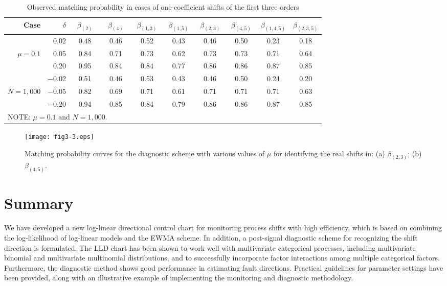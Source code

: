 \begin{table}[ht]
\tabcolsep 6.0pt \vspace{-0.3cm} \centering \caption{Observed matching probability
in cases of one-coefficient shifts of the first three orders} \vspace{0.3cm}
\renewcommand{\arraystretch}{1.25}
\begin{tabular}{r|r|c|c|c|c|c|c|c|c}\hline
Case & $\delta$ & $\;\;\beta_{(2)}\;\;$ & $\;\;\beta_{(4)}\;\;$ &
$\;\beta_{(1,3)}\;$ & $\;\beta_{(1,5)}\;$ & $\;\beta_{(2,3)\;}$ &
$\;\beta_{(4,5)}\;$ & $\beta_{(1,4,5)}$ & $\beta_{(2,3,5)}$
\\\hline
& 0.02 & 0.48 & 0.46 & 0.52 & 0.43 & 0.46 & 0.50 & 0.23 & 0.18 \\
$\mu=0.1$ & 0.05 & 0.84 & 0.71 & 0.73 & 0.62 & 0.73 & 0.73 & 0.71 & 0.64 \\
& 0.20 & 0.95 & 0.84 & 0.84 & 0.77 & 0.86 & 0.86 & 0.87 & 0.85 \\
& $-$0.02 & 0.51 & 0.46 & 0.53 & 0.43 & 0.46 & 0.50 & 0.24 & 0.20 \\
$N=1,000$ & $-$0.05 & 0.82 & 0.69 & 0.71 & 0.61 & 0.71 & 0.71 & 0.71 & 0.63 \\
& $-$0.20 & 0.94 & 0.85 & 0.84 & 0.79 & 0.86 & 0.86 & 0.87 & 0.85
\\\hline
\multicolumn{10}{l}{NOTE: $\mu=0.1$ and $N=1,000$.}
\end{tabular}\vspace{-0.3cm}
\end{table}

\begin{figure}[ht]
\begin{center}
\texttt{[image: fig3-3.eps]}
\vspace{-0.3cm} \caption{\small Matching probability curves for the diagnostic
scheme with various values of $\mu$ for identifying the real shifts in: (a)
$\beta_{(2,3)}$; (b) $\beta_{(4,5)}$.}\vspace{-0.3cm}
\end{center}
\end{figure}



\section{Summary}\label{sec3.7}

We have developed a new log-linear directional control chart for monitoring process
shifts with high efficiency, which is based on combining the log-likelihood of
log-linear models and the EWMA scheme. In addition, a post-signal diagnostic scheme
for recognizing the shift direction is formulated. The LLD chart has been shown to
work well with multivariate categorical processes, including multivariate binomial
and multivariate multinomial distributions, and to successfully incorporate factor
interactions among multiple categorical factors. Furthermore, the diagnostic method
shows good performance in estimating fault directions. Practical guidelines for
parameter settings have been provided, along with an illustrative example of
implementing the monitoring and diagnostic methodology.



